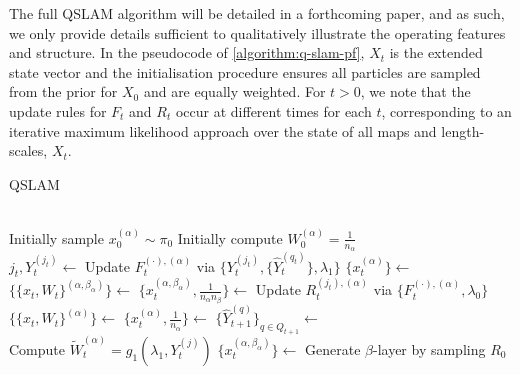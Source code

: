 The full QSLAM algorithm will be detailed in a forthcoming paper, and as such, we only provide details sufficient to qualitatively illustrate the operating features and structure. In the pseudocode of \cref{algorithm:q-slam-pf}, $X_t$ is the extended state vector and the initialisation procedure ensures all particles are sampled from the prior for $X_0$ and are equally weighted. For $t>0$, we note that the update rules for $F_t$ and $R_t$ occur at different times for each $t$, corresponding to an iterative maximum likelihood approach over the state of all maps and length-scales, $X_t$.
\begin{algorithm}[H] %
	\caption{QSLAM}\label{algorithm:q-slam-pf}
	\begin{algorithmic}[0] 
		\\
		\State Initially sample $x_{0}^{(\alpha)} \sim \pi_0$ 
		\State Initially compute $W_0^{(\alpha)} = \frac{1}{n_\alpha}$
		\EndFor
		\EndProcedure 
		\EndIf
		\\
		\State $j_t, Y_t^{(j_t)} \gets$ 
		\EndIf
		\State Update $F_t^{(\cdot), (\alpha)}$ via $ \{Y_t^{(j_t)},  \{\hat{Y}_t^{(q_t)}\}, \lambda_1\} $
		\State $\{x_{t}^{(\alpha)}\} \gets $ 
		\State $\{\{x_t, W_t\}^{(\alpha, \beta_\alpha)}\} \gets $ 
		\State $\{x_t^{(\alpha, \beta_\alpha)}, \frac{1}{n_\alpha n_\beta}\} \gets $ 
		\State Update $R_t^{(j_t), (\alpha)}$ via $\{F_t^{(\cdot), (\alpha)}, \lambda_0\} $
		\State $\{\{x_t, W_t\}^{(\alpha)}\} \gets$ 
		\State $\{x_t^{(\alpha)}, \frac{1}{n_\alpha}\} \gets $ 
		\EndFor
		\State $\{\hat{Y}_{t+1}^{(q)}\}_{q\in Q_{t+1}} \gets $ 
		\EndWhile \label{pseudoalgo:qslamr:endwhile2}			
		\EndProcedure
		\\ \dotfill
		\State Compute $\tilde{W}_t^{( \alpha )} = g_1(\lambda_1, Y_t^{(j)}) $ 
		\State $\{x_t^{(\alpha, \beta_\alpha)}\} \gets $  Generate $\beta$-layer by sampling $R_0$ 

\end{algorithmic}
\end{algorithm}
